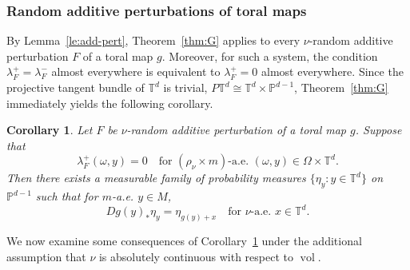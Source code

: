 \documentclass[a4paper,12pt,reqno]{amsart}
\numberwithin{equation}{section}
\newtheorem{corollary}[theorem]{Corollary}
\newcommand{\cal}{\mathcal}
\newcommand{\YY}{{\cal Y}}
\newcommand{\Pp}{{\mathbb{P}}}
\newcommand{\Tt}{{\mathbb{T}}}
\begin{document}


\subsubsection{Random additive perturbations of toral maps}
\label{Consequences}

By Lemma~\ref{le:add-pert}, Theorem~\ref{thm:G} applies to every $\nu$-random additive perturbation $F$ of a toral map $g$. Moreover, for such a system, the condition $\lambda_F^+=\lambda_F^-$ almost everywhere is equivalent to $\lambda_F^+=0$ almost everywhere. Since the projective tangent bundle of $\Tt^d$ is trivial, $P\Tt^d\cong \Tt^d\times\Pp^{d-1}$,
Theorem~\ref{thm:G} immediately yields the following corollary.

\begin{corollary}
\label{cor:H}
Let $F$ be $\nu$-random additive perturbation of a toral map $g$. Suppose that 
\[
\lambda^+_F(\omega,y)=0 \quad \text{for } (\rho_\nu \times m) \text{-a.e. } (\omega,y) \in \Omega \times \Tt^d.
\]
 Then there exists a measurable family of probability measures $\{\eta_y : y \in \Tt^d\}$ on $\Pp^{d-1}$ such that for $m$-a.e. $y \in M$, 
\[
Dg(y)_* \eta_y = \eta_{g(y)+x} \quad \text{for } \nu \text{-a.e. } x \in \Tt^d.
\]
\end{corollary}



We now examine some consequences of Corollary~\ref{cor:H} under the additional assumption that $\nu$ is absolutely continuous with respect to
$\operatorname{vol}$.
\end{document}
